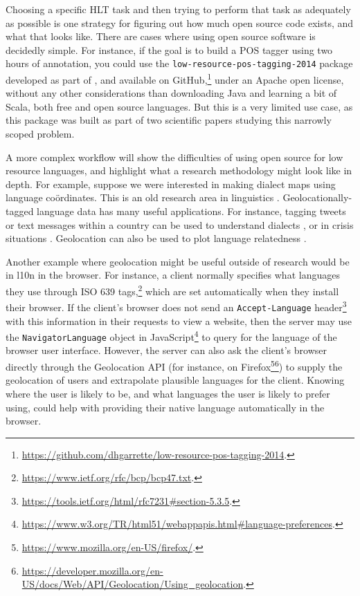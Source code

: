 Choosing a specific HLT task and then trying to perform that task as adequately as possible is one strategy for figuring out how much open source code exists, and what that looks like. There are cases where using open source software is decidedly simple. For instance, if the goal is to build a POS tagger using two hours of annotation, you could use the {\tt low-resource-pos-tagging-2014} package developed as part of \citet{garrette2013real,garrette2013learning}, and available on GitHub,\footnote{\href{https://github.com/dhgarrette/low-resource-pos-tagging-2014}{https://github.com/dhgarrette/low-resource-pos-tagging-2014}. } under an Apache open license, without any other considerations than downloading Java and learning a bit of Scala, both free and open source languages. But this is a very limited use case, as this package was built as part of two scientific papers studying this narrowly scoped problem.

A more complex workflow will show the difficulties of using open source for low resource languages, and highlight what a research methodology might look like in depth. For example, suppose we were interested in making dialect maps using language co\"ordinates. This is an old research area in linguistics \citep{trudgill1983on,labov2005atlas}. Geolocationally-tagged language data has many useful applications. For instance, tagging tweets or text messages within a country can be used to understand dialects \citep{mubarak2014using}, or in crisis situations \citep{lewis2010haitian}. Geolocation can also be used to plot language relatedness \citep{littauer2012visualizing}.

Another example where geolocation might be useful outside of research would be in l10n in the browser. For instance, a client normally specifies what languages they use through ISO 639 tags,\footnote{\href{https://www.ietf.org/rfc/bcp/bcp47.txt}{https://www.ietf.org/rfc/bcp/bcp47.txt}. } which are set automatically when they install their browser. If the client's browser does not send an {\tt Accept-Language} header\footnote{\href{https://tools.ietf.org/html/rfc7231\#section-5.3.5}{https://tools.ietf.org/html/rfc7231\#section-5.3.5}. } with this information in their requests to view a website, then the server may use the {\tt Navigator\-Language} object in JavaScript\footnote{\href{https://www.w3.org/TR/html51/webappapis.html\#language-preferences}{https://www.w3.org/TR/html51/webappapis.html\#language-preferences}. } to query for the language of the browser user interface. However, the server can also ask the client's browser directly through the Geolocation API (for instance, on Firefox\footnote{\href{https://www.mozilla.org/en-US/firefox/}{https://www.mozilla.org/en-US/firefox/}. }\footnote{\href{https://developer.mozilla.org/en-US/docs/Web/API/Geolocation/Using_geolocation}{https://developer.mozilla.org/en-US/docs/Web/API/Geolocation/Using\_geolocation}. }) to supply the geolocation of users and extrapolate plausible languages for the client. Knowing where the user is likely to be, and what languages the user is likely to prefer using, could help with providing their native language automatically in the browser.

